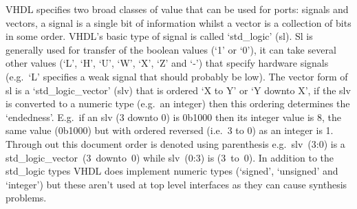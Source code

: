 VHDL specifies two broad classes of value that can be used for ports: signals and vectors, a signal is a single bit of information whilst a vector is a collection of bits in some order. VHDL's basic type of signal is called `std\_logic' (sl). Sl is generally used for transfer of the boolean values (`1' or `0'), it can take several other values (`L', `H', `U', `W', `X', `Z' and `-') that specify hardware signals (e.g.\ `L' specifies a weak signal that should probably be low). The vector form of sl is a `std\_logic\_vector' (slv) that is ordered `X to Y' or `Y downto X', if the slv is converted to a numeric type (e.g.\ an integer) then this ordering determines the `endedness'. E.g.\ if an slv (3 downto 0) is 0b1000 then its integer value is 8, the same value (0b1000) but with ordered reversed (i.e.\ 3 to 0) as an integer is 1. Through out this document order is denoted using parenthesis e.g.\ slv~(3:0) is a std\_logic\_vector~(3~downto~0) while slv~(0:3) is (3~to~0). In addition to the std\_logic types VHDL does implement numeric types (`signed', `unsigned' and `integer') but these aren't used at top level interfaces as they can cause synthesis problems.
